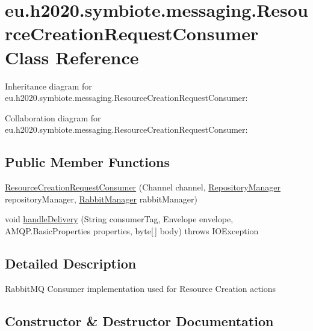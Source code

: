 \hypertarget{classeu_1_1h2020_1_1symbiote_1_1messaging_1_1ResourceCreationRequestConsumer}{}\section{eu.\+h2020.\+symbiote.\+messaging.\+Resource\+Creation\+Request\+Consumer Class Reference}
\label{classeu_1_1h2020_1_1symbiote_1_1messaging_1_1ResourceCreationRequestConsumer}


Inheritance diagram for eu.\+h2020.\+symbiote.\+messaging.\+Resource\+Creation\+Request\+Consumer\+:


Collaboration diagram for eu.\+h2020.\+symbiote.\+messaging.\+Resource\+Creation\+Request\+Consumer\+:
\subsection*{Public Member Functions}
\begin{DoxyCompactItemize}
\item 
\hyperlink{classeu_1_1h2020_1_1symbiote_1_1messaging_1_1ResourceCreationRequestConsumer_ad02c4274f1fa39b858e7c68120704e94}{Resource\+Creation\+Request\+Consumer} (Channel channel, \hyperlink{classeu_1_1h2020_1_1symbiote_1_1repository_1_1RepositoryManager}{Repository\+Manager} repository\+Manager, \hyperlink{classeu_1_1h2020_1_1symbiote_1_1messaging_1_1RabbitManager}{Rabbit\+Manager} rabbit\+Manager)
\item 
void \hyperlink{classeu_1_1h2020_1_1symbiote_1_1messaging_1_1ResourceCreationRequestConsumer_ac2192f2c6e6d644dc1ba1ca91a2fbb3c}{handle\+Delivery} (String consumer\+Tag, Envelope envelope, A\+M\+Q\+P.\+Basic\+Properties properties, byte\mbox{[}$\,$\mbox{]} body)  throws I\+O\+Exception 
\end{DoxyCompactItemize}


\subsection{Detailed Description}
Rabbit\+MQ Consumer implementation used for Resource Creation actions 

\subsection{Constructor \& Destructor Documentation}
